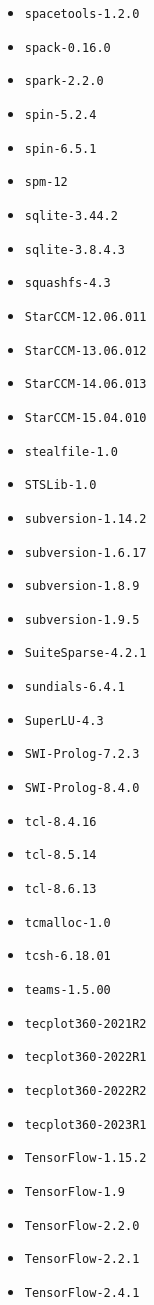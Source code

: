 \begin{multicols}{3}
\begin{itemize}
\item \verb|spacetools-1.2.0|
\item \verb|spack-0.16.0|
\item \verb|spark-2.2.0|
\item \verb|spin-5.2.4|
\item \verb|spin-6.5.1|
\item \verb|spm-12|
\item \verb|sqlite-3.44.2|
\item \verb|sqlite-3.8.4.3|
\item \verb|squashfs-4.3|
\item \verb|StarCCM-12.06.011|
\item \verb|StarCCM-13.06.012|
\item \verb|StarCCM-14.06.013|
\item \verb|StarCCM-15.04.010|
\item \verb|stealfile-1.0|
\item \verb|STSLib-1.0|
\item \verb|subversion-1.14.2|
\item \verb|subversion-1.6.17|
\item \verb|subversion-1.8.9|
\item \verb|subversion-1.9.5|
\item \verb|SuiteSparse-4.2.1|
\item \verb|sundials-6.4.1|
\item \verb|SuperLU-4.3|
\item \verb|SWI-Prolog-7.2.3|
\item \verb|SWI-Prolog-8.4.0|
\item \verb|tcl-8.4.16|
\item \verb|tcl-8.5.14|
\item \verb|tcl-8.6.13|
\item \verb|tcmalloc-1.0|
\item \verb|tcsh-6.18.01|
\item \verb|teams-1.5.00|
\item \verb|tecplot360-2021R2|
\item \verb|tecplot360-2022R1|
\item \verb|tecplot360-2022R2|
\item \verb|tecplot360-2023R1|
\item \verb|TensorFlow-1.15.2|
\item \verb|TensorFlow-1.9|
\item \verb|TensorFlow-2.2.0|
\item \verb|TensorFlow-2.2.1|
\item \verb|TensorFlow-2.4.1|

\end{itemize}
\end{multicols}
